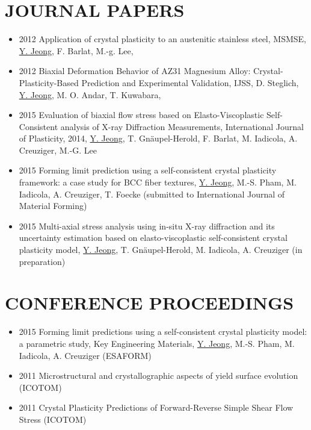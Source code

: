 \documentclass{res}
\begin{document}
\begin{resume}
  \section{JOURNAL PAPERS}
  \begin{itemize}
  \item 2012 Application of crystal plasticity to an austenitic stainless steel, MSMSE, \underline{Y. Jeong}, F. Barlat, M.-g. Lee,
  \item 2012 Biaxial Deformation Behavior of AZ31 Magnesium Alloy: Crystal-Plasticity-Based Prediction and Experimental Validation, IJSS, D. Steglich, \underline{Y. Jeong}, M. O. Andar, T. Kuwabara,
  \item 2015 Evaluation of biaxial flow stress based on Elasto-Viscoplastic Self-Consistent analysis of X-ray Diffraction Measurements, International Journal of Plasticity, 2014, \underline{Y. Jeong}, T. Gn\"{a}upel-Herold, F. Barlat, M. Iadicola, A. Creuziger, M.-G. Lee
  \item 2015 Forming limit prediction using a self-consistent crystal plasticity framework: a case study for BCC fiber textures, \underline{Y. Jeong}, M.-S. Pham, M. Iadicola, A. Creuziger, T. Foecke (submitted to International Journal of Material Forming)
  \item 2015 Multi-axial stress analysis using in-situ X-ray diffraction and its uncertainty estimation based on elasto-viscoplastic self-consistent crystal plasticity model, \underline{Y. Jeong}, T. Gn\"{a}upel-Herold, M. Iadicola, A. Creuziger (in preparation)
  \end{itemize}

  \section{CONFERENCE PROCEEDINGS}
  \begin{itemize}
  \item 2015 Forming limit predictions using a self-consistent crystal plasticity model: a parametric study, Key Engineering Materials, \underline{Y. Jeong}, M.-S. Pham, M. Iadicola, A. Creuziger (ESAFORM)
  \item 2011 Microstructural and crystallographic aspects of yield surface evolution (ICOTOM)
  \item 2011 Crystal Plasticity Predictions of Forward-Reverse Simple Shear Flow Stress (ICOTOM)
  \end{itemize}


\end{resume}
\end{document}
